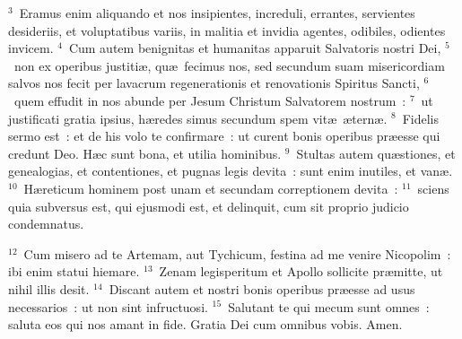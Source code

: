 ${}^{3}$~Eramus enim aliquando et nos insipientes, increduli, errantes, servientes desideriis, et voluptatibus variis, in malitia et invidia agentes, odibiles, odientes invicem.
${}^{4}$~Cum autem benignitas et humanitas apparuit Salvatoris nostri Dei,
${}^{5}$~non ex operibus justiti\ae , qu\ae\ fecimus nos, sed secundum suam misericordiam salvos nos fecit per lavacrum regenerationis et renovationis Spiritus Sancti,
${}^{6}$~quem effudit in nos abunde per Jesum Christum Salvatorem nostrum~:
${}^{7}$~ut justificati gratia ipsius, h\ae redes simus secundum spem vit\ae\ \ae tern\ae .
${}^{8}$~Fidelis sermo est~: et de his volo te confirmare~: ut curent bonis operibus pr\ae esse qui credunt Deo. H\ae c sunt bona, et utilia hominibus.
${}^{9}$~Stultas autem qu\ae stiones, et genealogias, et contentiones, et pugnas legis devita~: sunt enim inutiles, et van\ae .
${}^{10}$~H\ae reticum hominem post unam et secundam correptionem devita~:
${}^{11}$~sciens quia subversus est, qui ejusmodi est, et delinquit, cum sit proprio judicio condemnatus.


${}^{12}$~Cum misero ad te Artemam, aut Tychicum, festina ad me venire Nicopolim~: ibi enim statui hiemare.
${}^{13}$~Zenam legisperitum et Apollo sollicite pr\ae mitte, ut nihil illis desit.
${}^{14}$~Discant autem et nostri bonis operibus pr\ae esse ad usus necessarios~: ut non sint infructuosi.
${}^{15}$~Salutant te qui mecum sunt omnes~: saluta eos qui nos amant in fide. Gratia Dei cum omnibus vobis. Amen.

